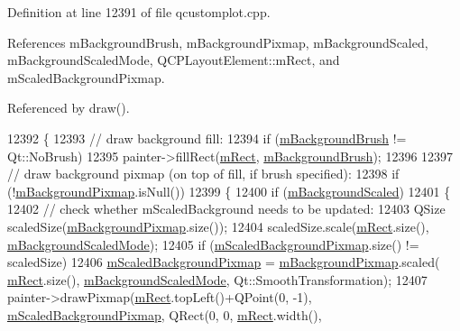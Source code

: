Definition at line 12391 of file qcustomplot.\+cpp.



References m\+Background\+Brush, m\+Background\+Pixmap, m\+Background\+Scaled, m\+Background\+Scaled\+Mode, Q\+C\+P\+Layout\+Element\+::m\+Rect, and m\+Scaled\+Background\+Pixmap.



Referenced by draw().


\begin{DoxyCode}
12392 \{
12393   \textcolor{comment}{// draw background fill:}
12394   \textcolor{keywordflow}{if} (\hyperlink{class_q_c_p_axis_rect_a5748e1a37f63c428e38b0a7724b46259}{mBackgroundBrush} != Qt::NoBrush)
12395     painter->fillRect(\hyperlink{class_q_c_p_layout_element_ad8896f05550389f7b9e92c9e6cdf6e01}{mRect}, \hyperlink{class_q_c_p_axis_rect_a5748e1a37f63c428e38b0a7724b46259}{mBackgroundBrush});
12396   
12397   \textcolor{comment}{// draw background pixmap (on top of fill, if brush specified):}
12398   \textcolor{keywordflow}{if} (!\hyperlink{class_q_c_p_axis_rect_a38fb1a15f43228a0c124553649303722}{mBackgroundPixmap}.isNull())
12399   \{
12400     \textcolor{keywordflow}{if} (\hyperlink{class_q_c_p_axis_rect_a5ad835f0fae5d7cc5ada9e063641dbf1}{mBackgroundScaled})
12401     \{
12402       \textcolor{comment}{// check whether mScaledBackground needs to be updated:}
12403       QSize scaledSize(\hyperlink{class_q_c_p_axis_rect_a38fb1a15f43228a0c124553649303722}{mBackgroundPixmap}.size());
12404       scaledSize.scale(\hyperlink{class_q_c_p_layout_element_ad8896f05550389f7b9e92c9e6cdf6e01}{mRect}.size(), \hyperlink{class_q_c_p_axis_rect_a859fd368e794663e346b4f53f35078e9}{mBackgroundScaledMode});
12405       \textcolor{keywordflow}{if} (\hyperlink{class_q_c_p_axis_rect_aa74b9415598d59b49290e41e42d7ee27}{mScaledBackgroundPixmap}.size() != scaledSize)
12406         \hyperlink{class_q_c_p_axis_rect_aa74b9415598d59b49290e41e42d7ee27}{mScaledBackgroundPixmap} = \hyperlink{class_q_c_p_axis_rect_a38fb1a15f43228a0c124553649303722}{mBackgroundPixmap}.scaled(
      \hyperlink{class_q_c_p_layout_element_ad8896f05550389f7b9e92c9e6cdf6e01}{mRect}.size(), \hyperlink{class_q_c_p_axis_rect_a859fd368e794663e346b4f53f35078e9}{mBackgroundScaledMode}, Qt::SmoothTransformation);
12407       painter->drawPixmap(\hyperlink{class_q_c_p_layout_element_ad8896f05550389f7b9e92c9e6cdf6e01}{mRect}.topLeft()+QPoint(0, -1), 
      \hyperlink{class_q_c_p_axis_rect_aa74b9415598d59b49290e41e42d7ee27}{mScaledBackgroundPixmap}, QRect(0, 0, \hyperlink{class_q_c_p_layout_element_ad8896f05550389f7b9e92c9e6cdf6e01}{mRect}.width(), 

\end{DoxyCode}
